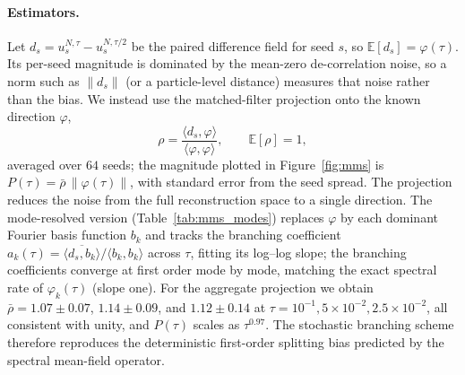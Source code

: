 \documentclass[a4paper,fleqn]{cas-sc}
\theoremstyle{definition}
\theoremstyle{remark}
\begin{document}
\paragraph{Estimators.}
Let $d_s=u^{N,\tau}_s-u^{N,\tau/2}_s$ be the paired difference field for seed $s$, so $\mathbb E[d_s]=\varphi(\tau)$.
Its per-seed magnitude is dominated by the mean-zero de-correlation noise, so a norm such as $\|d_s\|$ (or a
particle-level distance) measures that noise rather than the bias. We instead use the matched-filter projection
onto the known direction $\varphi$,
\begin{equation}\label{equ:rho}
\rho=\frac{\langle d_s,\varphi\rangle}{\langle\varphi,\varphi\rangle},\qquad \mathbb E[\rho]=1,
\end{equation}
averaged over $64$ seeds; the magnitude plotted in Figure~\ref{fig:mms} is $P(\tau)=\bar\rho\,\|\varphi(\tau)\|$,
with standard error from the seed spread. The projection reduces the noise from the full reconstruction space to
a single direction. The mode-resolved version (Table~\ref{tab:mms_modes}) replaces $\varphi$ by each dominant
Fourier basis function $b_k$ and tracks the branching coefficient $a_k(\tau)=\overline{\langle
d_s,b_k\rangle}/\langle b_k,b_k\rangle$ across $\tau$, fitting its log--log slope; the branching coefficients
converge at first order mode by mode, matching the exact spectral rate of $\varphi_k(\tau)$ (slope one). For the
aggregate projection we obtain $\bar\rho=1.07\pm0.07$, $1.14\pm0.09$, and $1.12\pm0.14$ at
$\tau=10^{-1},5\times10^{-2},2.5\times10^{-2}$, all consistent with unity, and $P(\tau)$ scales as $\tau^{0.97}$.
The stochastic branching scheme therefore reproduces the deterministic first-order splitting bias predicted by
the spectral mean-field operator.
\end{document}
